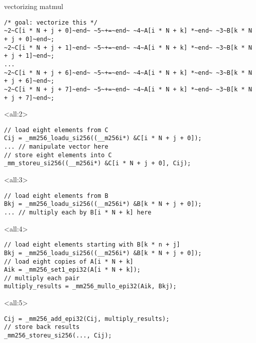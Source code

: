 \begin{frame}[fragile,label=sqSerialUnrolledExpand]{vectorizing matmul}
\begin{lstlisting}
/* goal: vectorize this */
~2~C[i * N + j + 0]~end~ ~5~+=~end~ ~4~A[i * N + k] *~end~ ~3~B[k * N + j + 0]~end~;
~2~C[i * N + j + 1]~end~ ~5~+=~end~ ~4~A[i * N + k] *~end~ ~3~B[k * N + j + 1]~end~;
...
~2~C[i * N + j + 6]~end~ ~5~+=~end~ ~4~A[i * N + k] *~end~ ~3~B[k * N + j + 6]~end~;
~2~C[i * N + j + 7]~end~ ~5~+=~end~ ~4~A[i * N + k] *~end~ ~3~B[k * N + j + 7]~end~;
\end{lstlisting}
\hrulefill
\begin{onlyenv}<all:2>
\begin{lstlisting}
// load eight elements from C
Cij = _mm256_loadu_si256((__m256i*) &C[i * N + j + 0]);
... // manipulate vector here
// store eight elements into C
_mm_storeu_si256((__m256i*) &C[i * N + j + 0], Cij);
\end{lstlisting}
\end{onlyenv}
\begin{onlyenv}<all:3>
\begin{lstlisting}
// load eight elements from B
Bkj = _mm256_loadu_si256((__m256i*) &B[k * N + j + 0]);
... // multiply each by B[i * N + k] here
\end{lstlisting}
\end{onlyenv}
\begin{onlyenv}<all:4>
\begin{lstlisting}
// load eight elements starting with B[k * n + j]
Bkj = _mm256_loadu_si256((__m256i*) &B[k * N + j + 0]);
// load eight copies of A[i * N + k]
Aik = _mm256_set1_epi32(A[i * N + k]);
// multiply each pair
multiply_results = _mm256_mullo_epi32(Aik, Bkj);
\end{lstlisting}
\end{onlyenv}
\begin{onlyenv}<all:5>
\begin{lstlisting}
Cij = _mm256_add_epi32(Cij, multiply_results);
// store back results
_mm256_storeu_si256(..., Cij);
\end{lstlisting}
\end{onlyenv}
\end{frame}



